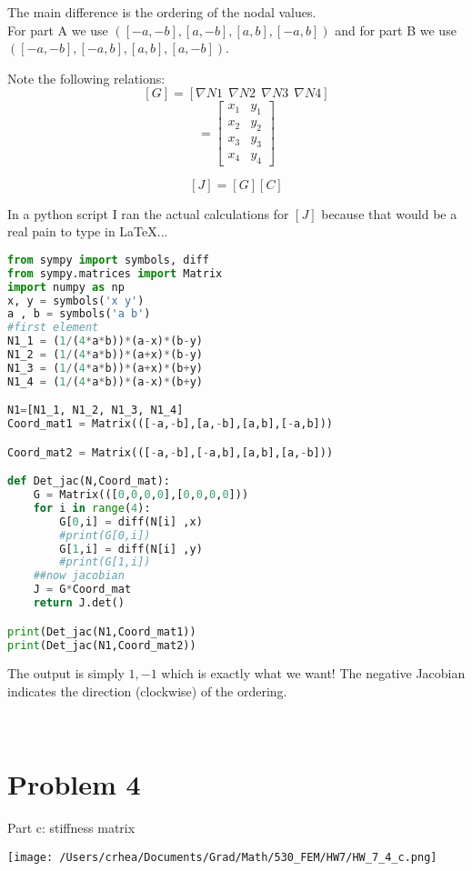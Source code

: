 \documentclass[11pt]{amsart}
\begin{document}
The main difference is the ordering of the nodal values.  \\
For part A we use $([-a,-b],[a,-b],[a,b],[-a,b])$ and for part B we use $([-a,-b],[-a,b],[a,b],[a,-b])$.

Note the following relations:
$$[G] = [\nabla N1 \ \ \nabla N2 \ \ \nabla N3 \ \ \nabla N4]$$
\begin{equation*}
[C] = 
  \begin{bmatrix}
    x_1&y_1\\
    x_2&y_2\\
    x_3&y_3\\
    x_4&y_4
  \end{bmatrix}
\end{equation*}

$$[J] = [G][C] $$

In a python script I ran the actual calculations for $[J]$ because that would be a real pain to type in \LaTeX...



\begin{lstlisting}[language=Python]
from sympy import symbols, diff
from sympy.matrices import Matrix
import numpy as np
x, y = symbols('x y')
a , b = symbols('a b')
#first element
N1_1 = (1/(4*a*b))*(a-x)*(b-y)
N1_2 = (1/(4*a*b))*(a+x)*(b-y)
N1_3 = (1/(4*a*b))*(a+x)*(b+y)
N1_4 = (1/(4*a*b))*(a-x)*(b+y)

N1=[N1_1, N1_2, N1_3, N1_4]
Coord_mat1 = Matrix(([-a,-b],[a,-b],[a,b],[-a,b]))

Coord_mat2 = Matrix(([-a,-b],[-a,b],[a,b],[a,-b]))

def Det_jac(N,Coord_mat):
    G = Matrix(([0,0,0,0],[0,0,0,0]))
    for i in range(4):
        G[0,i] = diff(N[i] ,x)
        #print(G[0,i])
        G[1,i] = diff(N[i] ,y)
        #print(G[1,i])
    ##now jacobian
    J = G*Coord_mat
    return J.det()

print(Det_jac(N1,Coord_mat1))
print(Det_jac(N1,Coord_mat2))


\end{lstlisting}

The output is simply $1 , -1$ which is exactly what we want! The negative Jacobian indicates the direction (clockwise) of the ordering.

\

\section{Problem 4}
Part c: stiffness matrix \\
\begin{center}
\texttt{[image: /Users/crhea/Documents/Grad/Math/530\_FEM/HW7/HW\_7\_4\_c.png]}
\end{center}
\end{document}
